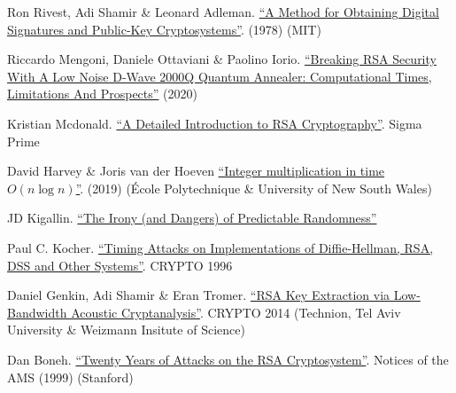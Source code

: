\documentclass{article}
\begin{document}
\begin{thebibliography}{10}

 Ron Rivest, Adi Shamir \& Leonard Adleman. \href{https://people.csail.mit.edu/rivest/Rsapaper.pdf}{``A Method for Obtaining Digital Signatures and Public-Key Cryptosystems''}. (1978) (MIT)

 Riccardo Mengoni, Daniele Ottaviani \& Paolino Iorio. \href{https://arxiv.org/pdf/2005.02268.pdf}{``Breaking RSA Security With A Low Noise D-Wave 2000Q Quantum Annealer: Computational Times, Limitations And Prospects''} (2020)

 Kristian Mcdonald. \href{https://blog.sigmaprime.io/introduction-to-rsa.html}{``A Detailed Introduction to RSA Cryptography''}. Sigma Prime

 David Harvey \& Joris van der Hoeven \href{https://hal.archives-ouvertes.fr/hal-02070778/document}{``Integer multiplication in time $O(n \log n)$''}. (2019) (\'Ecole Polytechnique \& University of New South Wales) 

 JD Kigallin. \href{https://info.keyfactor.com/factoring-rsa-keys-in-the-iot-era}{``The Irony (and Dangers) of Predictable Randomness''}

 Paul C. Kocher. \href{https://www.paulkocher.com/doc/TimingAttacks.pdf}{``Timing Attacks on Implementations of Diffie-Hellman, RSA, DSS and Other Systems''}. CRYPTO 1996 

 Daniel Genkin, Adi Shamir \& Eran Tromer. \href{https://www.cs.tau.ac.il/~tromer/papers/acoustic-20131218.pdf}{``RSA Key Extraction via Low-Bandwidth Acoustic Cryptanalysis''}. CRYPTO 2014 (Technion, Tel Aviv University \& Weizmann Insitute of Science)

 Dan Boneh. \href{http://www.ams.org/notices/199902/boneh.pdf}{``Twenty Years of Attacks on the RSA Cryptosystem''}. Notices of the AMS (1999) (Stanford)



\end{thebibliography}
\end{document}
